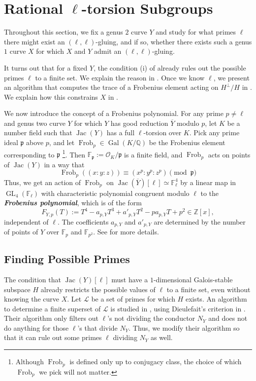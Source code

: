 \documentclass{amsproc}
\numberwithin{equation}{section}
\theoremstyle{definition}
\theoremstyle{remark}
\newcommand{\vocab}[1]{\textbf{\textit{\boldmath #1}}}
\DeclareMathOperator{\Jac}{Jac}
\DeclareMathOperator{\GL}{GL}
\DeclareMathOperator{\Frob}{Frob}
\DeclareMathOperator{\Gal}{Gal}
\newcommand{\ZZ}{\mathbb Z}
\newcommand{\QQ}{\mathbb Q}
\newcommand{\FF}{\mathbb F}
\begin{document}
\section{Rational \texorpdfstring{$\ell$}{ℓ}-torsion Subgroups}
\label{sec:frob_element}
Throughout this section, we fix a genus $2$ curve $Y$ and study for what primes $\ell$ there might exist an $(\ell, \ell)$-gluing, and if so, whether there exists such a genus $1$ curve $X$ for which $X$ and $Y$ admit an $(\ell, \ell)$-gluing.

It turns out that for a fixed $Y$, the condition (i) of  already rules out the possible primes $\ell$ to a finite set. We explain the reason in . Once we know $\ell$, we present an algorithm that computes the trace of a Frobenius element acting on $H^\perp/H$ in . We explain how this constrains $X$ in .

We now introduce the concept of a Frobenius polynomial. For any prime $p\neq\ell$ and genus two curve $Y$ for which $Y$ has good reduction $\overline Y$ modulo $p$, let $K$ be a number field such that $\Jac(Y)$ has a full $\ell$-torsion over $K$. Pick any prime ideal $\mathfrak p$ above $p$, and let $\Frob_p\in\Gal(K/\QQ)$ 
be the Frobenius element corresponding to $\mathfrak p$%
\footnote{Although $\Frob_p$ is defined only up to conjugacy class, the choice of which $\Frob_p$ we pick will not matter.}.
Then $\FF_{\mathfrak p} := \mathcal O_K/\mathfrak p$ is a finite field, and $\Frob_p$ acts on points of $\Jac(Y)$ 
in a way that
\begin{equation}
    \Frob_p((x:y:z)) \equiv  (x^p:y^p:z^p)\pmod{\mathfrak p}
\end{equation}
Thus, we get an action of $\Frob_p$ on $\Jac(\overline Y)[\ell]\simeq\FF_\ell^4$ by a linear map in $\GL_4(\FF_\ell)$ with characteristic polynomial congruent modulo $\ell$ to the \vocab{Frobenius polynomial}, which is of the form
\begin{equation}
    \label{eq:frob_poly_Y}
    F_{Y,p}(T) := T^4 - a_{p,Y}T^3 + a'_{p,Y}T^2 - pa_{p,Y}T + p^2 \in \ZZ[x],
\end{equation}
independent of $\ell$.
The coefficients $a_{p,Y}$ and $a'_{p,Y}$ are determined by the number of points of $Y$ over $\FF_p$ and $\FF_{p^2}$. See \cite[Chapter II]{milne_av} for more details.
\subsection{Finding Possible Primes}
\label{subsec:finding_ell}
The condition that $\Jac(Y)[\ell]$ must have a $1$-dimensional Galois-stable subspace $H$ already restricts the possible values of $\ell$ to a finite set, even without knowing the curve $X$. Let $\mathcal L$ be a set of primes for which $H$ exists. An algorithm to determine a finite superset of $\mathcal L$ is studied in \cite[\S 3.1]{computing_isogeny}, using Dieulefait's criterion in  \cite[\S 3.1]{dieulefait_criterion}.
Their algorithm only filters out $\ell$'s not dividing the conductor $N_Y$ and does not do anything for those $\ell$'s that divide $N_Y$.
Thus, we modify their algorithm so that it can rule out some primes $\ell$ dividing $N_Y$ as well.
\end{document}
